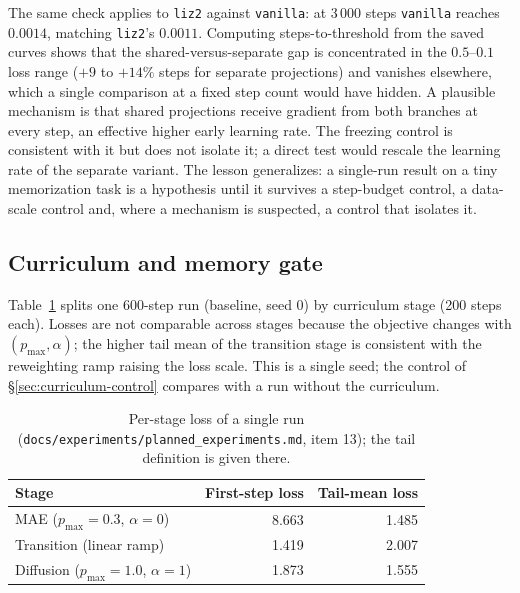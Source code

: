 \documentclass[11pt]{article}
\begin{document}
The same check applies to \texttt{liz2} against \texttt{vanilla}: at
3\,000 steps \texttt{vanilla} reaches $0.0014$, matching \texttt{liz2}'s
$0.0011$. Computing steps-to-threshold from the saved curves shows that the
shared-versus-separate gap is concentrated in the $0.5$--$0.1$ loss range
($+9$ to $+14\%$ steps for separate projections) and vanishes elsewhere,
which a single comparison at a fixed step count would have hidden. A plausible
mechanism is that shared projections receive gradient from both branches at
every step, an effective higher early learning rate. The freezing control is
consistent with it but does not isolate it; a direct test would rescale the
learning rate of the separate variant. The lesson generalizes: a single-run
result on a tiny memorization task is a hypothesis until it survives a
step-budget control, a data-scale control and, where a mechanism is
suspected, a control that isolates it.

\subsection{Curriculum and memory gate}

Table~\ref{tab:stages} splits one 600-step run (baseline, seed 0) by
curriculum stage (200 steps each). Losses are not comparable across stages
because the objective changes with $(p_{\max},\alpha)$; the higher tail mean
of the transition stage is consistent with the reweighting ramp raising the
loss scale. This is a single seed; the control of \S\ref{sec:curriculum-control} compares with a run without the curriculum.

\begin{table}[t]
\centering
\small
\begin{tabular}{lrr}
\toprule
Stage & First-step loss & Tail-mean loss \\
\midrule
MAE ($p_{\max}=0.3$, $\alpha=0$) & 8.663 & 1.485 \\
Transition (linear ramp) & 1.419 & 2.007 \\
Diffusion ($p_{\max}=1.0$, $\alpha=1$) & 1.873 & 1.555 \\
\bottomrule
\end{tabular}
\caption{Per-stage loss of a single run
(\nolinkurl{docs/experiments/planned_experiments.md}, item 13); the tail
definition is given there.}
\label{tab:stages}
\end{table}
\end{document}
